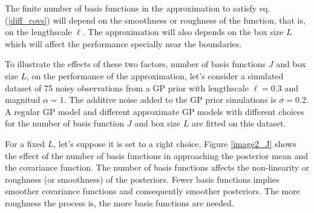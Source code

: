 \documentclass[]{interact}
\theoremstyle{plain}%
\theoremstyle{definition}
\theoremstyle{remark}
\begin{document}
The finite number of basis functions in the approximation to satisfy eq. (\ref{diff_covs}) will depend on the smoothness or roughness of the function, that is, on the lengthscale $\ell$. The approximation will also depends on the box size $L$ which will affect the performance specially near the boundaries. 

To illustrate the effects of these two factors, number of basis functions $J$ and box size $L$, on the performance of the approximation, let's consider a simulated dataset of 75 noisy observations from a GP prior with lengthscale $\ell=0.3$ and magnitud $\alpha=1$. The additive noise added to the GP prior simulations is $\sigma=0.2$. A regular GP model and different approximate GP models with different choices for the number of basis function $J$ and box size $L$ are fitted on this dataset. 

For a fixed $L$, let's suppose it is set to a right choice, Figure \ref{image2_J} shows the effect of the number of basis functions in approaching the posterior mean and the covariance function. The number of basis functions affects the non-linearity or roughness (or smoothness) of the posteriors. Fewer basis functions implies smoother covariance functions and consequently smoother posteriors. The more roughness the process is, the more basis functions are needed. 
\end{document}
